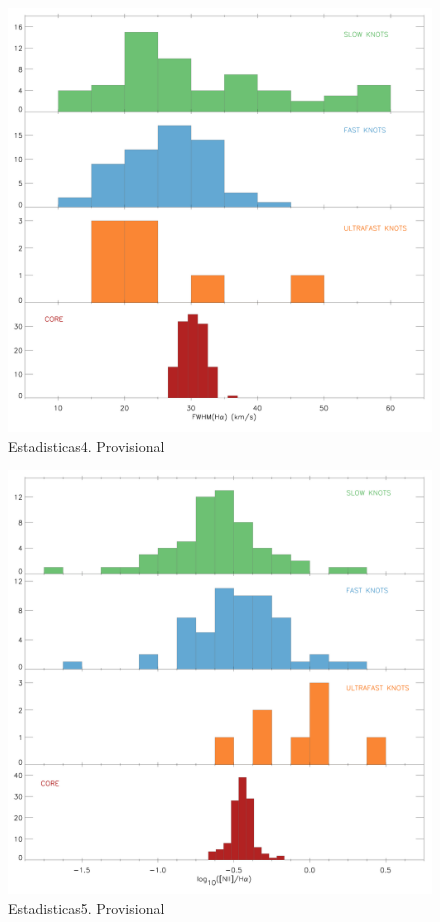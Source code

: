 \documentclass[a4paper,fleqn,usenatbib]{mnras}     %
\begin{document}
\begin{figure}
    \includegraphics[width=\columnwidth]{Figs/prov/Hist_FWHM_Ha.pdf} 
    \caption{Estadisticas4. Provisional}
\end{figure}

\begin{figure}
   \includegraphics[width=\columnwidth]{Figs/prov/Hist_NIIHa.pdf} 
    \caption{Estadisticas5. Provisional}
\end{figure}
\end{document}
